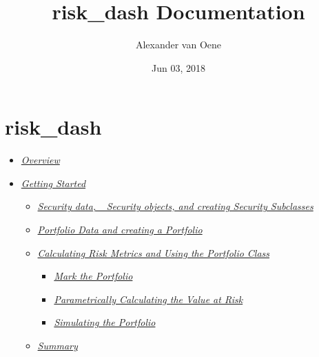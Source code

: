 \documentclass[letterpaper,10pt,english]{sphinxmanual}
\title{risk\_dash Documentation}
\date{Jun 03, 2018}
\author{Alexander van Oene}
\begin{document}
\maketitle
\sphinxtableofcontents
{}\label{\detokenize{index::doc}}

\label{\detokenize{gettingstarted:gettingstarted}}

\chapter{risk\_dash}
\label{\detokenize{gettingstarted:risk-dash}}\label{\detokenize{gettingstarted::doc}}\begin{itemize}
\item {} 
{\hyperref[\detokenize{gettingstarted:overview}]{\emph{Overview}}}

\item {} 
{\hyperref[\detokenize{gettingstarted:getting-started}]{\emph{Getting Started}}}
\begin{itemize}
\item {} 
{\hyperref[\detokenize{gettingstarted:security-data-security-objects-and-creating-security-subclasses}]{\emph{Security data, \_Security objects, and creating Security
Subclasses}}}

\item {} 
{\hyperref[\detokenize{gettingstarted:portfolio-data-and-creating-a-portfolio}]{\emph{Portfolio Data and creating a
Portfolio}}}

\item {} 
{\hyperref[\detokenize{gettingstarted:calculating-risk-metrics-and-using-the-portfolio-class}]{\emph{Calculating Risk Metrics and Using the Portfolio
Class}}}
\begin{itemize}
\item {} 
{\hyperref[\detokenize{gettingstarted:mark-the-portfolio}]{\emph{Mark the Portfolio}}}

\item {} 
{\hyperref[\detokenize{gettingstarted:parametrically-calculating-the-value-at-risk}]{\emph{Parametrically Calculating the Value at
Risk}}}

\item {} 
{\hyperref[\detokenize{gettingstarted:simulating-the-portfolio}]{\emph{Simulating the Portfolio}}}

\end{itemize}

\item {} 
{\hyperref[\detokenize{gettingstarted:summary}]{\emph{Summary}}}

\end{itemize}

\end{itemize}
\end{document}
